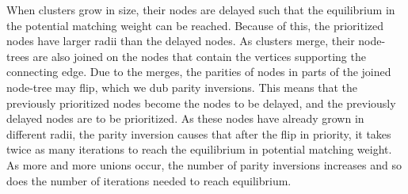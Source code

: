 When clusters grow in size, their nodes are delayed such that the equilibrium in the potential matching weight can be reached. Because of this, the prioritized nodes have larger radii than the delayed nodes. As clusters merge, their node-trees are also joined on the nodes that contain the vertices supporting the connecting edge. Due to the merges, the parities of nodes in parts of the joined node-tree may flip, which we dub parity inversions. This means that the previously prioritized nodes become the nodes to be delayed, and the previously delayed nodes are to be prioritized. As these nodes have already grown in different radii, the parity inversion causes that after the flip in priority, it takes twice as many iterations to reach the equilibrium in potential matching weight. As more and more unions occur, the number of parity inversions increases and so does the number of iterations needed to reach equilibrium. 

